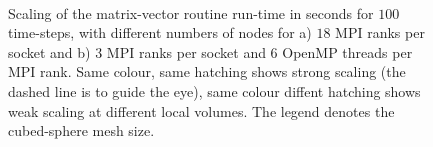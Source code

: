 \documentclass[review,times]{elsarticle}
\begin{document}
\begin{figure}
  \begin{center}
    \\
    \caption{\label{fig:OMP_scale}Scaling of the matrix-vector routine
      run-time in seconds for $100$ time-steps, with different numbers
      of nodes for a) $18$ MPI ranks per socket and b) $3$ MPI ranks
      per socket and $6$ OpenMP threads per MPI rank. Same colour,
      same hatching shows strong scaling (the dashed line is to guide
      the eye), same colour diffent hatching shows weak scaling at
      different local volumes. The legend denotes the cubed-sphere
      mesh size.}
  \end{center}
\end{figure}
\end{document}
